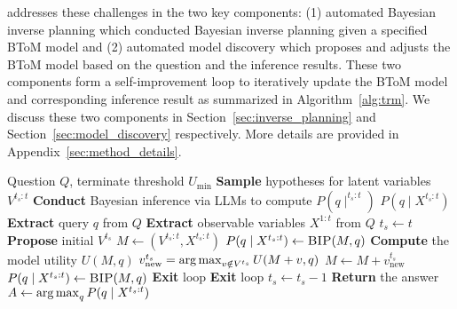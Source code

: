 \ours addresses these challenges in the two key components: (1) automated Bayesian inverse planning which conducted Bayesian inverse planning given a specified BToM model and (2) automated model discovery which proposes and adjusts the BToM model based on the question and the inference results. These two components form a self-improvement loop to iteratively update the BToM model and corresponding inference result as summarized in Algorithm~\ref{alg:trm}. We discuss these two components in Section~\ref{sec:inverse_planning} and Section~\ref{sec:model_discovery} respectively. More details are provided in Appendix~\ref{sec:method_details}.


\begin{algorithm}[t!]
\caption{\ours}
\begin{algorithmic}[1]
\small
\Require 
    Question $Q$, terminate threshold $U_\text{min}$
    \State \textbf{Sample} hypotheses for latent variables $V^{t_s:t}$
    \State \textbf{Conduct} Bayesian inference via LLMs to compute $P(q \mid ^{t_s:t})$ 
    \State \Return $P(q \mid X^{t_s:t})$
\EndFunction
{}
\State \textbf{Extract} query $q$ from $Q$  %
\State \textbf{Extract} observable variables $X^{1:t}$ from $Q$%
\State $t_s \gets t$
\State \textbf{Propose} initial $V^{t_s}$
\State $M \leftarrow (V^{t_s:t}, X^{t_s:t})$
\State $P(q \mid X^{t_s:t}) \gets \textproc{BIP} (M, q)$
\State \textbf{Compute} the model utility $U(M, q)$
    \State $v^{t_s}_\text{new} = \operatorname*{arg\,max}_{v\notin V^{t_s}}U(M + v, q)$ 
        \State $M \gets M + v^{t_s}_\text{new}$
        \State $P(q \mid  X^{t_s:t}) \gets \textproc{BIP} (M, q)$
    \Else
        \State \textbf{Exit} loop
    \EndIf
\EndWhile
{} %
    \State \textbf{Exit} loop
\Else
    \State $t_s \gets t_s - 1$
\EndIf
\EndWhile
\State \textbf{Return} the answer $A \gets \operatorname*{arg\,max}_{q} P(q \mid  X^{t_s:t})$

\end{algorithmic}
\label{alg:trm}
\end{algorithm}





